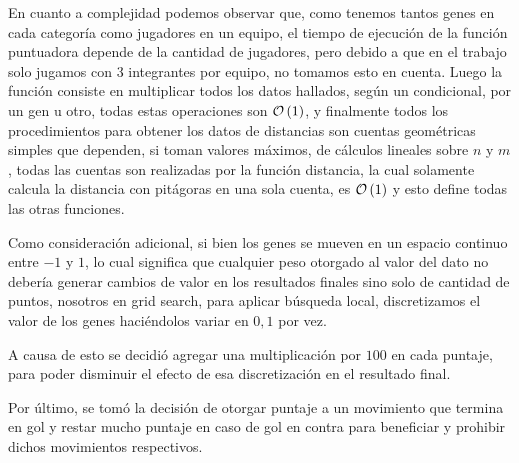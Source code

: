 En cuanto a complejidad podemos observar que, como tenemos tantos genes en cada categoría como jugadores en un
equipo, el tiempo de ejecución de la función puntuadora depende de la cantidad de jugadores,
pero debido a que en el trabajo solo jugamos con 3 integrantes por equipo, no tomamos esto en cuenta.
Luego la función consiste en multiplicar todos los datos hallados, según un condicional, por un gen u otro,
todas estas operaciones son $\mathcal{O}\left(1\right)$, y finalmente todos los procedimientos para obtener los datos de distancias
son cuentas geométricas simples que dependen, si toman valores máximos, de cálculos lineales sobre $n$ y $m$, todas
las cuentas son realizadas por la función distancia, la cual solamente calcula la distancia con pitágoras en una sola
cuenta, es $\mathcal{O}\left(1\right)$ y esto define todas las otras funciones.



Como consideración adicional, si bien los genes se mueven en un espacio continuo entre $-1$ y $1$,
lo cual significa que cualquier peso otorgado al valor del dato no debería generar
cambios de valor en los resultados finales sino solo de cantidad de puntos,
nosotros en grid search, para aplicar búsqueda local, discretizamos el valor de los
genes haciéndolos variar en $0,1$ por vez.


A causa de esto se decidió agregar una multiplicación por $100$ en cada puntaje,
para poder disminuir el efecto de esa discretización en el resultado final.


Por último, se tomó la decisión de otorgar puntaje a un movimiento que termina
en gol y restar mucho puntaje en caso de gol en contra para beneficiar y
prohibir dichos movimientos respectivos.


